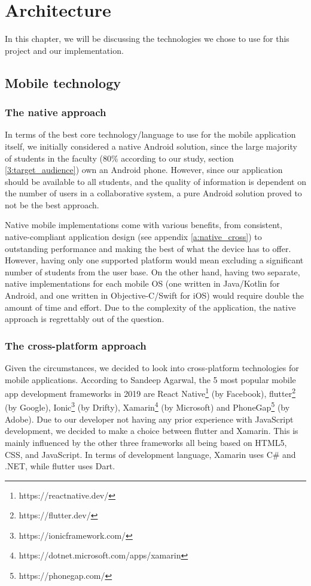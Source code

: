\chapter{Architecture} \label{chapter5}

In this chapter, we will be discussing the technologies we chose to use for this project and our implementation.

\section{Mobile technology} \label{5:technology}

\subsection{The native approach} \label{5:technology_native}

In terms of the best core technology/language to use for the mobile application itself, we initially considered a native Android solution, since the large majority of students in the faculty (80\% according to our study, section \ref{3:target_audience}) own an Android phone. However, since our application should be available to all students, and the quality of information is dependent on the number of users in a collaborative system, a pure Android solution proved to not be the best approach.

Native mobile implementations come with various benefits, from consistent, native-compliant application design (see appendix \ref{a:native_cross}) to outstanding performance and making the best of what the device has to offer. However, having only one supported platform would mean excluding a significant number of students from the user base. On the other hand, having two separate, native implementations for each mobile OS (one written in Java/Kotlin for Android, and one written in Objective-C/Swift for iOS) would require double the amount of time and effort. Due to the complexity of the application, the native approach is regrettably out of the question.

\subsection{The cross-platform approach} \label{5:technology_cross}

Given the circumstances, we decided to look into cross-platform technologies for mobile applications. According to Sandeep Agarwal\cite{agarwal2019best}, the 5 most popular mobile app development frameworks in 2019 are React Native\footnote{https://reactnative.dev/} (by Facebook), \gls{flutter}\footnote{https://flutter.dev/} (by Google), Ionic\footnote{https://ionicframework.com/} (by Drifty), Xamarin\footnote{https://dotnet.microsoft.com/apps/xamarin} (by Microsoft) and PhoneGap\footnote{https://phonegap.com/} (by Adobe). Due to our developer not having any prior experience with JavaScript development, we decided to make a choice between \gls{flutter} and Xamarin. This is mainly influenced by the other three frameworks all being based on HTML5, CSS, and JavaScript. In terms of development language, Xamarin uses C\# and .NET, while \gls{flutter} uses Dart.

